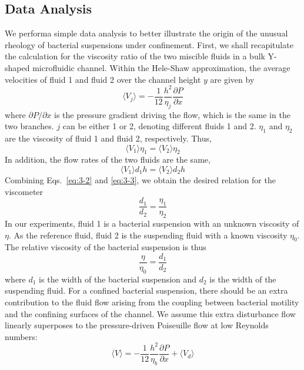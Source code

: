 \subsection{Data Analysis}
We performa simple data analysis to better illustrate the origin of the unusual rheology of bacterial suspensions under confinement.
First, we shall recapitulate the calculation for the viscosity ratio of the two miscible fluids in a bulk Y-shaped microfluidic channel. Within the Hele-Shaw approximation, the average velocities of fluid 1 and fluid 2 over the channel height $y$ are given by \cite{Lamb1932}
\begin{equation}
  \langle V_j \rangle = -\frac{1}{12}\frac{h^2}{\eta_j}\frac{\partial P}{\partial x}
\end{equation}
where $\partial P/\partial x$ is the pressure gradient driving the flow, which is the same in the two branches. $j$ can be either 1 or 2, denoting different fluids 1 and 2. $\eta_1$ and $\eta_2$ are the viscosity of fluid 1 and fluid 2, respectively. Thus,
\begin{equation}
  \label{eq:3-2}
  \langle V_1 \rangle \eta_1 = \langle V_2 \rangle \eta_2
\end{equation}
In addition, the flow rates of the two fluids are the same,
\begin{equation}
  \label{eq:3-3}
  \langle V_1 \rangle d_1 h = \langle V_2 \rangle d_2 h
\end{equation}
Combining Eqs.~\ref{eq:3-2} and \ref{eq:3-3}, we obtain the desired relation for the viscometer
$$
	\frac{d_1}{d_2} = \frac{\eta_1}{\eta_2}
$$
In our experiments, fluid 1 is a bacterial suspension with an unknown viscosity of $\eta$. As the reference fluid, fluid 2 is the suspending fluid with a known viscosity $\eta_0$. The relative viscosity of the bacterial suspension is thus \cite{Gachelin2013}
\begin{equation}
  \label{eq:3-4}
  \frac{\eta}{\eta_0} = \frac{d_1}{d_2}
\end{equation}
where $d_1$ is the width of the bacterial suspension and $d_2$ is the width of the suspending fluid. For a confined bacterial suspension, there should be an extra contribution to the fluid flow arising from the coupling between bacterial motility and the confining surfaces of the channel. We assume this extra disturbance flow linearly superposes to the pressure-driven Poiseuille flow at low Reynolds numbers:
\begin{equation}
  \label{eq:3-5}
  \langle V \rangle = -\frac{1}{12}\frac{h^2}{\eta_b}\frac{\partial P}{\partial x} + \langle V_d \rangle
\end{equation}
